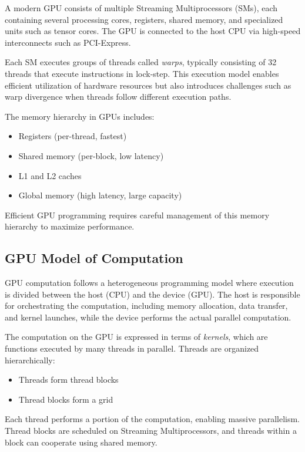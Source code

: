 A modern GPU consists of multiple Streaming Multiprocessors (SMs), each containing several processing cores, registers, shared memory, and specialized units such as tensor cores. The GPU is connected to the host CPU via high-speed interconnects such as PCI-Express. 

Each SM executes groups of threads called \textit{warps}, typically consisting of 32 threads that execute instructions in lock-step. This execution model enables efficient utilization of hardware resources but also introduces challenges such as warp divergence when threads follow different execution paths.

The memory hierarchy in GPUs includes:
\begin{itemize}
    \item Registers (per-thread, fastest)
    \item Shared memory (per-block, low latency)
    \item L1 and L2 caches
    \item Global memory (high latency, large capacity)
\end{itemize}

Efficient GPU programming requires careful management of this memory hierarchy to maximize performance. 

\subsection{GPU Model of Computation}

GPU computation follows a heterogeneous programming model where execution is divided between the host (CPU) and the device (GPU). The host is responsible for orchestrating the computation, including memory allocation, data transfer, and kernel launches, while the device performs the actual parallel computation. \cite{cuda_lecture}

The computation on the GPU is expressed in terms of \textit{kernels}, which are functions executed by many threads in parallel. Threads are organized hierarchically:
\begin{itemize}
    \item Threads form thread blocks
    \item Thread blocks form a grid
\end{itemize}

Each thread performs a portion of the computation, enabling massive parallelism. Thread blocks are scheduled on Streaming Multiprocessors, and threads within a block can cooperate using shared memory. \cite{cuda_lecture}

